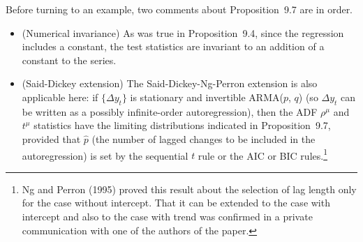Before turning to an example, two comments about Proposition~9.7 are in order.

\begin{itemize}
\item (Numerical invariance) \enspace As was true in Proposition~9.4, since the regression
includes a constant, the test statistics are invariant to an addition of a constant to
the series.

\item (Said-Dickey extension) \enspace The Said-Dickey-Ng-Perron extension is also applicable here: if $\{\Delta y_t\}$ is stationary and invertible ARMA($p$, $q$) (so $\Delta y_t$ can be
written as a possibly infinite-order autoregression), then the ADF $\rho^\mu$ and $t^\mu$
statistics have the limiting distributions indicated in Proposition~9.7, provided
that $\hat{p}$ (the number of lagged changes to be included in the autoregression) is set
by the sequential $t$ rule or the AIC or BIC rules.\footnote{Ng and Perron (1995) proved this result about the selection of lag length only for the case without intercept.
That it can be extended to the case with intercept and also to the case with trend was confirmed in a private
communication with one of the authors of the paper.}
\end{itemize}

